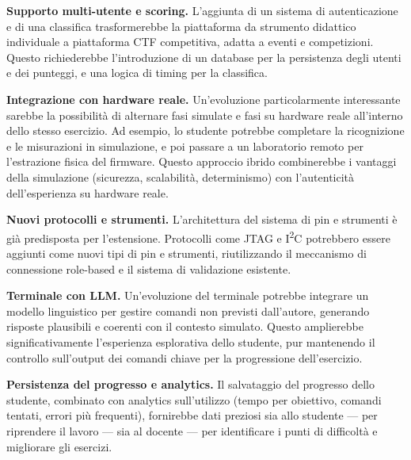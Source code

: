 \textbf{Supporto multi-utente e scoring.} L'aggiunta di un sistema di autenticazione e di una classifica trasformerebbe la piattaforma da strumento didattico individuale a piattaforma CTF competitiva, adatta a eventi e competizioni. Questo richiederebbe l'introduzione di un database per la persistenza degli utenti e dei punteggi, e una logica di timing per la classifica.

\textbf{Integrazione con hardware reale.} Un'evoluzione particolarmente interessante sarebbe la possibilità di alternare fasi simulate e fasi su hardware reale all'interno dello stesso esercizio. Ad esempio, lo studente potrebbe completare la ricognizione e le misurazioni in simulazione, e poi passare a un laboratorio remoto per l'estrazione fisica del firmware. Questo approccio ibrido combinerebbe i vantaggi della simulazione (sicurezza, scalabilità, determinismo) con l'autenticità dell'esperienza su hardware reale.

\textbf{Nuovi protocolli e strumenti.} L'architettura del sistema di pin e strumenti è già predisposta per l'estensione. Protocolli come JTAG e I\textsuperscript{2}C potrebbero essere aggiunti come nuovi tipi di pin e strumenti, riutilizzando il meccanismo di connessione role-based e il sistema di validazione esistente.

\textbf{Terminale con LLM.} Un'evoluzione del terminale potrebbe integrare un modello linguistico per gestire comandi non previsti dall'autore, generando risposte plausibili e coerenti con il contesto simulato. Questo amplierebbe significativamente l'esperienza esplorativa dello studente, pur mantenendo il controllo sull'output dei comandi chiave per la progressione dell'esercizio.

\textbf{Persistenza del progresso e analytics.} Il salvataggio del progresso dello studente, combinato con analytics sull'utilizzo (tempo per obiettivo, comandi tentati, errori più frequenti), fornirebbe dati preziosi sia allo studente --- per riprendere il lavoro --- sia al docente --- per identificare i punti di difficoltà e migliorare gli esercizi.
